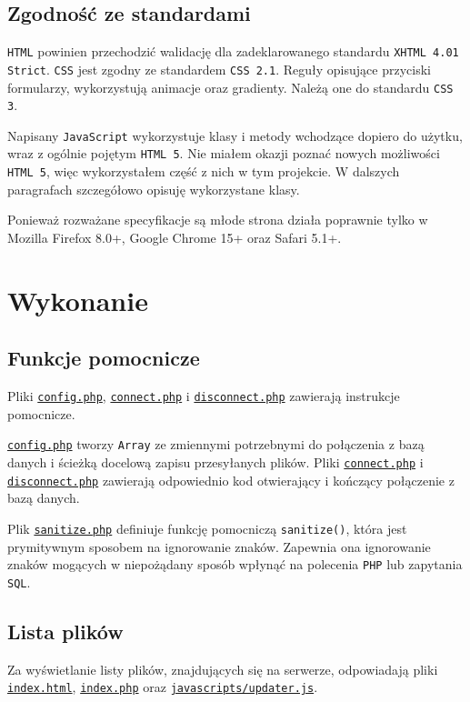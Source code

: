\documentclass[10pt,a4paper]{article}
\newcommand{\f}[1]{\texttt{#1}}
\newcommand{\rev}{35c18ee3786b53133ca699f3f44c15e18e2d7a25}
\newcommand{\revhref}[1] {\href{https://github.com/student-tomasz/pi-cwiczenie-4/blob/\rev/#1}{\f{#1}}}
\begin{document}
\subsection{Zgodność ze standardami}

\f{HTML} powinien przechodzić walidację dla zadeklarowanego standardu \f{XHTML
4.01 Strict}. \f{CSS} jest zgodny ze standardem \f{CSS 2.1}. Reguły opisujące
przyciski formularzy, wykorzystują animacje oraz gradienty. Należą one do
standardu \f{CSS 3}.

Napisany \f{JavaScript} wykorzystuje klasy i metody wchodzące dopiero do użytku,
wraz z ogólnie pojętym \f{HTML 5}. Nie miałem okazji poznać nowych możliwości
\f{HTML 5}, więc wykorzystałem część z nich w tym projekcie. W dalszych
paragrafach szczegółowo opisuję wykorzystane klasy.

Ponieważ rozważane specyfikacje są młode strona działa poprawnie tylko w Mozilla
Firefox 8.0+, Google Chrome 15+ oraz Safari 5.1+.



\section{Wykonanie}


\subsection{Funkcje pomocnicze}

Pliki \revhref{config.php}, \revhref{connect.php} i \revhref{disconnect.php}
zawierają instrukcje pomocnicze.

\revhref{config.php} tworzy \f{Array} ze zmiennymi potrzebnymi do połączenia z
bazą danych i ścieżką docelową zapisu przesyłanych plików. Pliki
\revhref{connect.php} i \revhref{disconnect.php} zawierają odpowiednio kod
otwierający i kończący połączenie z bazą danych.

Plik \revhref{sanitize.php} definiuje funkcję pomocniczą \f{sanitize()}, która
jest prymitywnym sposobem na ignorowanie znaków. Zapewnia ona ignorowanie znaków
mogących w niepożądany sposób wpłynąć na polecenia \f{PHP} lub zapytania
\f{SQL}.


\subsection{Lista plików}

Za wyświetlanie listy plików, znajdujących się na serwerze, odpowiadają pliki
\revhref{index.html}, \revhref{index.php} oraz \revhref{javascripts/updater.js}.
\end{document}
